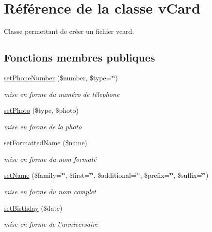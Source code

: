 \hypertarget{classvCard}{
\section{R\'{e}f\'{e}rence de la classe v\-Card}
\label{classvCard}
}
Classe permettant de cr\'{e}er un fichier vcard.  


\subsection*{Fonctions membres publiques}
\begin{CompactItemize}
\item 
\hyperlink{classvCard_a0}{set\-Phone\-Number} (\$number, \$type=\char`\"{}\char`\"{})
\begin{CompactList}\small\item\em mise en forme du num\'{e}ro de t\'{e}lephone \item\end{CompactList}\item 
\hyperlink{classvCard_a1}{set\-Photo} (\$type, \$photo)
\begin{CompactList}\small\item\em mise en forme de la photo \item\end{CompactList}\item 
\hyperlink{classvCard_a2}{set\-Formatted\-Name} (\$name)
\begin{CompactList}\small\item\em mise en forme du nom format\'{e} \item\end{CompactList}\item 
\hyperlink{classvCard_a3}{set\-Name} (\$family=\char`\"{}\char`\"{}, \$first=\char`\"{}\char`\"{}, \$additional=\char`\"{}\char`\"{}, \$prefix=\char`\"{}\char`\"{}, \$suffix=\char`\"{}\char`\"{})
\begin{CompactList}\small\item\em mise en forme du nom complet \item\end{CompactList}\item 
\hyperlink{classvCard_a4}{set\-Birthday} (\$date)
\begin{CompactList}\small\item\em mise en forme de l'anniversaire \item\end{CompactList}\item 

\end{CompactItemize}
